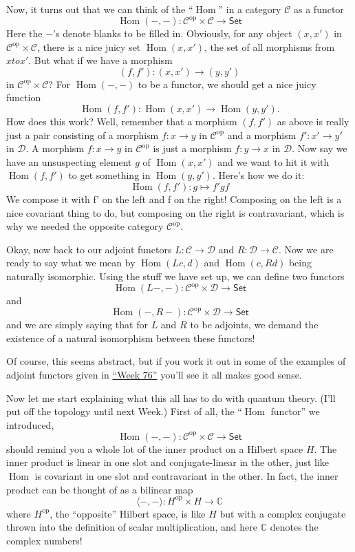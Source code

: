 \documentclass{article}
\begin{document}
Now, it turns out that we can think of the ``\(\operatorname{Hom}\)'' in
a category \(\mathcal{C}\) as a functor
\[\operatorname{Hom}(-,-)\colon\mathcal{C}^\mathrm{op}\times\mathcal{C}\to\mathsf{Set}\]
Here the \(-\)'s denote blanks to be filled in. Obviously, for any
object \((x,x')\) in \(\mathcal{C}^\mathrm{op}\times\mathcal{C}\), there
is a nice juicy set \(\operatorname{Hom}(x,x')\), the set of all
morphisms from \(x to x'\). But what if we have a morphism
\[(f,f')\colon(x,x')\to(y,y')\] in
\(\mathcal{C}^\mathrm{op}\times\mathcal{C}\)? For
\(\operatorname{Hom}(-,-)\) to be a functor, we should get a nice juicy
function
\[\operatorname{Hom}(f,f')\colon\operatorname{Hom}(x,x')\to\operatorname{Hom}(y,y').\]
How does this work? Well, remember that a morphism \((f,f')\) as above
is really just a pair consisting of a morphism \(f\colon x\to y\) in
\(\mathcal{C}^\mathrm{op}\) and a morphism \(f'\colon x'\to y'\) in
\(\mathcal{D}\). A morphism \(f\colon x\to y\) in
\(\mathcal{C}^\mathrm{op}\) is just a morphism \(f\colon y\to x\) in
\(\mathcal{D}\). Now say we have an unsuspecting element \(g\) of
\(\operatorname{Hom}(x,x')\) and we want to hit it with
\(\operatorname{Hom}(f,f')\) to get something in
\(\operatorname{Hom}(y,y')\). Here's how we do it:
\[\operatorname{Hom}(f,f')\colon g \mapsto f'gf\] We compose it with f'
on the left and f on the right! Composing on the left is a nice
covariant thing to do, but composing on the right is contravariant,
which is why we needed the opposite category
\(\mathcal{C}^\mathrm{op}\).

Okay, now back to our adjoint functors
\(L\colon\mathcal{C}\to\mathcal{D}\) and
\(R\colon\mathcal{D}\to\mathcal{C}\). Now we are ready to say what we
mean by \(\operatorname{Hom}(Lc,d)\) and \(\operatorname{Hom}(c,Rd)\)
being naturally isomorphic. Using the stuff we have set up, we can
define two functors
\[\operatorname{Hom}(L-,-)\colon\mathcal{C}^\mathrm{op}\times\mathcal{D}\to\mathsf{Set}\]
and
\[\operatorname{Hom}(-,R-)\colon\mathcal{C}^\mathrm{op}\times \mathcal{D} \to\mathsf{Set}\]
and we are simply saying that for \(L\) and \(R\) to be adjoints, we
demand the existence of a natural isomorphism between these functors!

Of course, this seems abstract, but if you work it out in some of the
examples of adjoint functors given in \protect\hyperlink{week76}{``Week
76''} you'll see it all makes good sense.

Now let me start explaining what this all has to do with quantum theory.
(I'll put off the topology until next Week.) First of all, the
``\(\operatorname{Hom}\) functor'' we introduced,
\[\operatorname{Hom}(-,-)\colon\mathcal{C}^\mathrm{op}\times\mathcal{C}\to\mathsf{Set}\]
should remind you a whole lot of the inner product on a Hilbert space
\(H\). The inner product is linear in one slot and conjugate-linear in
the other, just like \(\operatorname{Hom}\) is covariant in one slot and
contravariant in the other. In fact, the inner product can be thought of
as a bilinear map
\[\langle -,- \rangle\colon H^\mathrm{op}\times H \to\mathbb{C}\] where
\(H^\mathrm{op}\), the ``opposite'' Hilbert space, is like \(H\) but
with a complex conjugate thrown into the definition of scalar
multiplication, and here \(\mathbb{C}\) denotes the complex numbers!
\end{document}
